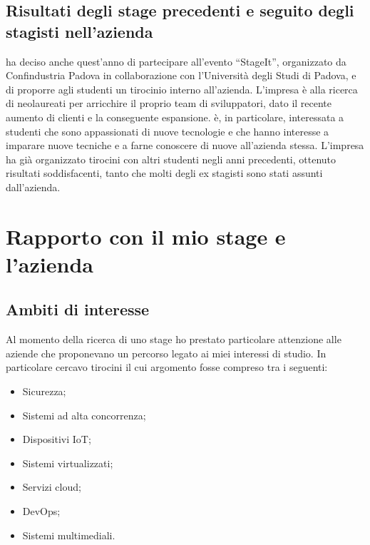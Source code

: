    \subsection{Risultati degli stage precedenti e seguito degli stagisti nell'azienda}
   \nomeAzienda{} ha deciso anche quest'anno di partecipare all'evento ``StageIt'', organizzato da Confindustria Padova in collaborazione con l'Università degli Studi di Padova, e di proporre agli studenti un tirocinio interno all'azienda. L'impresa è alla ricerca di neolaureati per arricchire il proprio team di sviluppatori, dato il recente aumento di clienti e la conseguente espansione. 
   \nomeAzienda{} è, in particolare, interessata a studenti che sono appassionati di nuove tecnologie e che hanno interesse a imparare nuove tecniche e a farne conoscere di nuove all'azienda stessa.
   L'impresa ha già organizzato tirocini con altri studenti negli anni precedenti, ottenuto risultati soddisfacenti, tanto che molti degli ex stagisti sono stati assunti dall'azienda.

\section{Rapporto con il mio stage e l'azienda}
   \subsection{Ambiti di interesse}
   Al momento della ricerca di uno stage ho prestato particolare attenzione alle aziende che proponevano un percorso legato ai miei interessi di studio. In particolare cercavo tirocini il cui argomento fosse compreso tra i seguenti:
   \begin{itemize}
      \item{Sicurezza;}
      \item{Sistemi ad alta concorrenza;}
      \item{Dispositivi IoT;}
      \item{Sistemi virtualizzati;}
      \item{Servizi cloud;}
      \item{DevOps;}
      \item{Sistemi multimediali.}
   \end{itemize}


